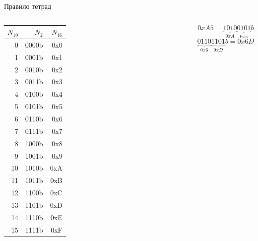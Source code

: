 \documentclass{beamer}
\begin{document}
    \begin{frame}{Правило тетрад}
        \begin{columns}
        \begin{table}\small
            \begin{tabular}{|r|r|r|}
            \hline  $N_{10}$  & $N_2$   & $N_{16}$ \\
            \hline    0     & 0000b   &   0x0  \\
            \hline    1     & 0001b   &   0x1  \\
            \hline    2     & 0010b   &   0x2  \\
            \hline    3     & 0011b   &   0x3  \\
            \hline    4     & 0100b   &   0x4  \\
            \hline    5     & 0101b   &   0x5  \\
            \hline    6     & 0110b   &   0x6  \\
            \hline    7     & 0111b   &   0x7  \\
            \hline    8     & 1000b   &   0x8  \\
            \hline    9     & 1001b   &   0x9  \\
            \hline    10    & 1010b   &   0xA  \\
            \hline    11    & 1011b   &   0xB  \\
            \hline    12    & 1100b   &   0xC  \\
            \hline    13    & 1101b   &   0xD  \\
            \hline    14    & 1110b   &   0xE  \\
            \hline    15    & 1111b   &   0xF  \\
            \hline
            \end{tabular}
        \end{table}
        $$
            0xA5 = \underbrace{1010}_{0xA}\underbrace{0101}_{0x5}b
        $$
        $$
            \underbrace{0110}_{0x6}\underbrace{1101}_{0xD}b = 0x6D 
        $$
        \pause
        \pause
        \end{columns}
    \end{frame}
\end{document}
